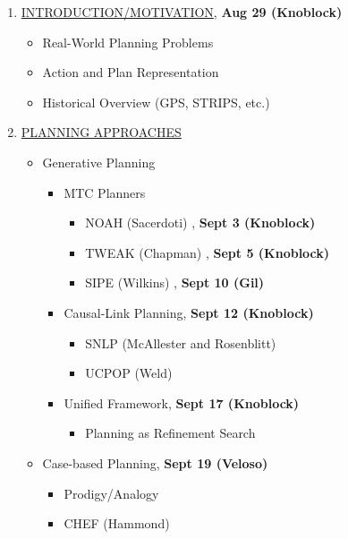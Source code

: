\begin{enumerate}

\item \underline{INTRODUCTION/MOTIVATION}, {\bf Aug 29 (Knoblock)}
   \begin{itemize}
   \item Real-World Planning Problems
   \item Action and Plan Representation
   \item Historical Overview (GPS, STRIPS, etc.) \cite[chapter 15]{cohen82}
   \end{itemize}

\item \underline{PLANNING APPROACHES}

  \begin{itemize}
  \item Generative Planning 

      \begin{itemize}
      \item MTC Planners
	\begin{itemize}
        \item NOAH (Sacerdoti) \cite[pages 162-170]{allen90}, {\bf Sept 3 (Knoblock)}
        \item TWEAK (Chapman) \cite[pages 537-558]{allen90}, {\bf Sept 5 (Knoblock)} 

        \item SIPE (Wilkins) \cite[pages 319-335]{allen90}, {\bf Sept 10 (Gil)}
	\end{itemize}

      \item Causal-Link Planning, {\bf Sept 12 (Knoblock)}
	\begin{itemize}
        \item SNLP (McAllester and Rosenblitt) \cite{mcallester91}
        \item UCPOP (Weld) \cite{weld94:pop}
	\end{itemize}

      \item Unified Framework, {\bf Sept 17 (Knoblock)}
	\begin{itemize}
	\item Planning as Refinement Search \cite{kambhampati95:joint-aij} 
	\end{itemize}
  \end{itemize}


  \item Case-based Planning, {\bf Sept 19 (Veloso)} 
      \begin{itemize}
      \item Prodigy/Analogy \cite{veloso94:analogy}
      \item CHEF (Hammond) \cite[pages 655-659]{allen90}
      \end{itemize}


\end{itemize}
\end{enumerate}
